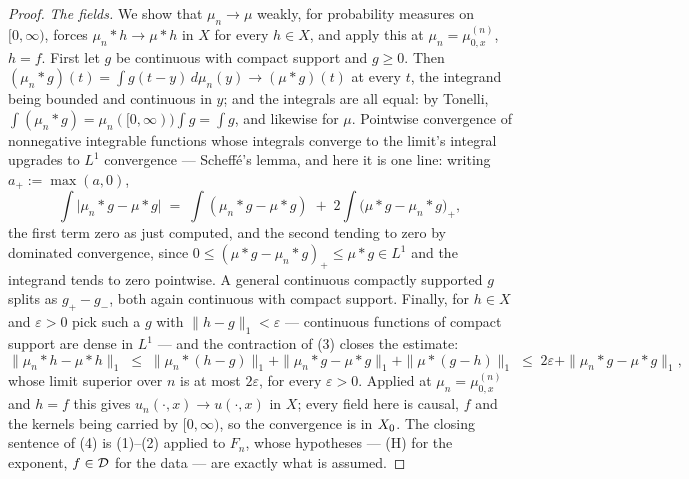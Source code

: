 \begin{proof}
\emph{The fields.} We show that $\mu_n \to \mu$ weakly, for probability measures on
$[0,\infty)$, forces $\mu_n * h \to \mu * h$ in $X$ for every $h \in X$, and apply this at
$\mu_n = \mu^{(n)}_{0,x}$, $h = f$. First let $g$ be continuous with compact support and
$g \ge 0$. Then $(\mu_n * g)(t) = \int g(t-y)\,d\mu_n(y) \to (\mu * g)(t)$ at every $t$,
the integrand being bounded and continuous in $y$; and the integrals are all equal: by
Tonelli, $\int (\mu_n * g) = \mu_n([0,\infty))\int g = \int g$, and likewise for $\mu$.
Pointwise convergence of nonnegative integrable functions whose integrals converge to the
limit's integral upgrades to $L^1$ convergence --- Scheffé's lemma, and here it is one
line: writing $a_+ := \max(a, 0)$,
\[
  \int\bigl|\mu_n * g - \mu * g\bigr|
  \;=\; \int(\mu_n * g - \mu * g) \;+\; 2\int\bigl(\mu * g - \mu_n * g\bigr)_+ ,
\]
the first term zero as just computed, and the second tending to zero by dominated
convergence, since $0 \le (\mu * g - \mu_n * g)_+ \le \mu * g \in L^1$ and the integrand
tends to zero pointwise. A general continuous compactly supported $g$ splits as
$g_+ - g_-$, both again continuous with compact support. Finally, for $h \in X$ and
$\varepsilon > 0$ pick such a $g$ with $\|h - g\|_1 < \varepsilon$ --- continuous functions
of compact support are dense in $L^1$ --- and the contraction of (3) closes the estimate:
\[
  \|\mu_n * h - \mu * h\|_1
  \;\le\; \|\mu_n * (h - g)\|_1 + \|\mu_n * g - \mu * g\|_1 + \|\mu * (g - h)\|_1
  \;\le\; 2\varepsilon + \|\mu_n * g - \mu * g\|_1 ,
\]
whose limit superior over $n$ is at most $2\varepsilon$, for every $\varepsilon > 0$.
Applied at $\mu_n = \mu^{(n)}_{0,x}$ and $h = f$ this gives $u_n(\cdot,x) \to u(\cdot,x)$
in $X$; every field here is causal, $f$ and the kernels being carried by $[0,\infty)$, so
the convergence is in $X_0$. The closing sentence of (4) is (1)--(2) applied to $F_n$,
whose hypotheses --- (H) for the exponent, $f \in \mathcal{D}$ for the data --- are exactly what
is assumed.
\end{proof}

